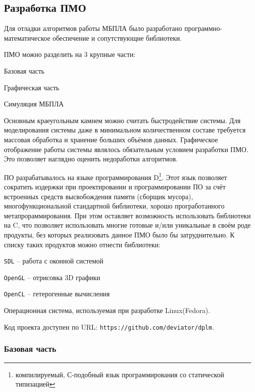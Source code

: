 \subsection{Разработка ПМО}

Для отладки алгоритмов работы МБПЛА было разработано
программно-математическое обеспечение и сопутствующие библиотеки.

ПМО можно разделить на 3 крупные части:

\begin{mintemize}
\item Базовая часть
\item Графическая часть
\item Симуляция МБПЛА
\end{mintemize}

Основным краеугольным камнем можно считать быстродействие системы.
Для моделирования системы даже в минимальном количественном составе
требуется массовая обработка и хранение больших объёмов данных. Графическое
отображение работы системы являлось обязательным условием разработки ПМО.
Это позволяет наглядно оценить недоработки алгоритмов.

ПО разрабатывалось на языке программирования D\footnote{компилируемый, С-подобный
язык программирования со статической типизацией}. Этот язык позволяет сократить
издержки при проектировании и программировании ПО за счёт встроенных средств
высвобождения памяти (сборщик мусора), многофункциональной стандартной
библиотеки, хорошо програботанного метапрораммирования. При этом оставляет
возможность использовать библиотеки на C, что позволяет использовать
многие готовые и/или уникальные в своём роде продукты, без которых
реализовать данное ПМО было бы затруднительно. К списку таких продуктов
можно отнести библиотеки:

\begin{mintemize}
\item \verb|SDL| -- работа с оконной системой
\item \verb|OpenGL| -- отрисовка 3D графики
\item \verb|OpenCL| -- гетерогенные вычисления
\end{mintemize}

Операционная система, используемая при разработке Linux(Fedora).

Код проекта доступен по URL: \verb|https://github.com/deviator/dplm|.

\newpage
\subsubsection{Базовая часть}

